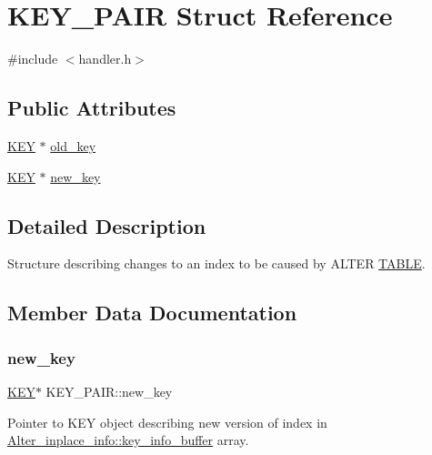\hypertarget{structKEY__PAIR}{}\section{K\+E\+Y\+\_\+\+P\+A\+IR Struct Reference}
\label{structKEY__PAIR}


{\ttfamily \#include $<$handler.\+h$>$}

\subsection*{Public Attributes}
\begin{DoxyCompactItemize}
\item 
\mbox{\hyperlink{structst__key}{K\+EY}} $\ast$ \mbox{\hyperlink{structKEY__PAIR_a877ecf9a313678a20cb24c1dde207245}{old\+\_\+key}}
\item 
\mbox{\hyperlink{structst__key}{K\+EY}} $\ast$ \mbox{\hyperlink{structKEY__PAIR_a25f827d0b994f28eeed47376cea439b6}{new\+\_\+key}}
\end{DoxyCompactItemize}


\subsection{Detailed Description}
Structure describing changes to an index to be caused by A\+L\+T\+ER \mbox{\hyperlink{structTABLE}{T\+A\+B\+LE}}. 

\subsection{Member Data Documentation}
\mbox{\label{structKEY__PAIR_a25f827d0b994f28eeed47376cea439b6}} 
\subsubsection{\texorpdfstring{new\+\_\+key}{new\_key}}
{\footnotesize\ttfamily \mbox{\hyperlink{structst__key}{K\+EY}}$\ast$ K\+E\+Y\+\_\+\+P\+A\+I\+R\+::new\+\_\+key}

Pointer to K\+EY object describing new version of index in \mbox{\hyperlink{classAlter__inplace__info_a1774915f106804ab1aeb6629d58bcae4}{Alter\+\_\+inplace\+\_\+info\+::key\+\_\+info\+\_\+buffer}} array. \mbox{\label{structKEY__PAIR_a877ecf9a313678a20cb24c1dde207245}} 
